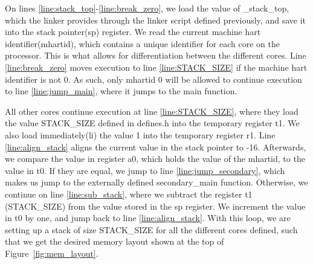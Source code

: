 On lines \ref{line:stack_top}-\ref{line:break_zero}, we load the value of
\_stack\_top, which the linker provides through the linker script defined
previously, and save it into the stack pointer(sp) register. We read the current
machine hart identifier(mhartid), which contains a unique identifier for each
core on the processor. This is what allows for differentiation between the
different cores. Line \ref{line:break_zero} moves execution to line
\ref{line:STACK_SIZE} if the machine hart identifier is not 0. As such, only
mhartid 0 will be allowed to continue execution to line \ref{line:jump_main},
where it jumps to the main function.

All other cores continue execution at line \ref{line:STACK_SIZE}, where they
load the value STACK\_SIZE defined in defines.h into the temporary register t1. We also load immediately(li) the value
1 into the temporary register r1. Line \ref{line:align_stack} aligns the current
value in the stack pointer to -16. Afterwards, we compare the value in
register a0, which holds the value of the mhartid, to the value in t0. If they
are equal, we jump to line \ref{line:jump_secondary}, which makes us jump to
the externally defined secondary\_main function. Otherwise, we continue on
line \ref{line:sub_stack}, where we subtract the register t1 (STACK\_SIZE)
from the value stored in the sp register. We increment the value in t0 by one,
and jump back to line \ref{line:align_stack}. With this loop, we are setting
up a stack of size STACK\_SIZE for all the different cores defined, such that
we get the desired memory layout shown at the top of
Figure~\ref{fig:mem_layout}.

